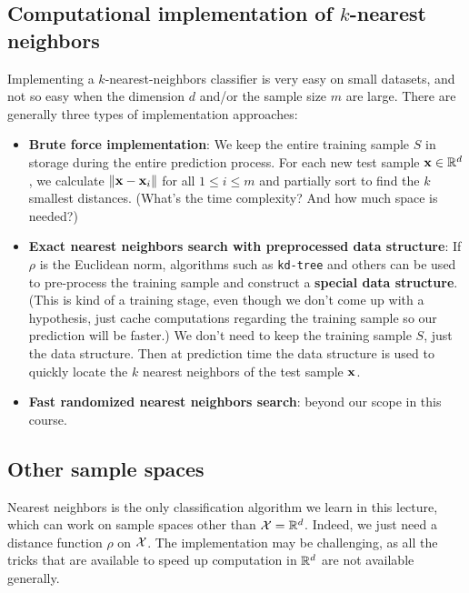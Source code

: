 \subsection{Computational implementation of $k$-nearest neighbors}

Implementing a $k$-nearest-neighbors classifier is very easy on small datasets,
and not so easy when the dimension $d$ and/or the sample size $m$ are large.
There are generally three types of implementation approaches:

\begin{itemize}
  \item {\bf Brute force implementation}: We keep the entire training sample $S$
    in storage during the entire prediction process. For each new test sample
    $\mathbf{x}\in\mathbb{R}^d$, we calculate $\left\| \mathbf{x}-\mathbf{x}_i\right\|$ for all $1\leq i\leq
    m$ and partially sort to find the $k$ smallest distances. (What's the time
    complexity? And how much space is needed?)
  \item {\bf Exact nearest neighbors search with preprocessed data structure}:
    If $\rho$ is the Euclidean norm,
    algorithms such as {\tt kd-tree} and others can be used to pre-process the
    training sample and construct a {\bf special data structure}. (This is kind of a
      training stage, even though we don't come up with a hypothesis, just
      cache computations regarding the training sample so our prediction will be
    faster.) We don't need to keep the training sample $S$, just the data
    structure. Then at prediction time the data structure is used to quickly
    locate the $k$ nearest neighbors of the test sample $\mathbf{x}$.
  \item {\bf Fast randomized nearest neighbors search}: 
    beyond our scope in this course.
\end{itemize}



\subsection{Other sample spaces}

Nearest neighbors is the only classification algorithm we learn in this lecture,
which can work on sample spaces other than $\mathcal{X}=\mathbb{R}^d$. Indeed, we just need a
distance function $\rho$ on $\mathcal{X}$. The implementation may be challenging, as all
the tricks that are available to speed up computation in $\mathbb{R}^d$ are not
available generally. 

